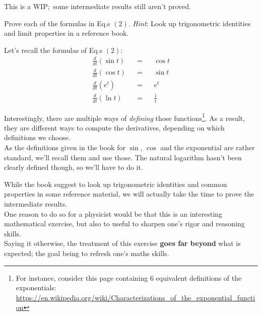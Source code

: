 \documentclass[solutions.tex]{subfiles}
\begin{document}
\maketitle
\begin{remark} This is a WIP; some intermediate results still
aren't proved.
\end{remark}
\begin{exercise} Prove each of the formulas in Eq.s $(2)$.
\textit{Hint}: Look up trigonometric identities and limit
properties in a reference book.
\end{exercise}

Let's recall the formulas of Eq.s $(2)$:
\begin{equation*} \begin{aligned}
	\frac{d}{dt}(\sin t) &&=&& \cos t \\
	\frac{d}{dt}(\cos t) &&=&& \sin t \\
	\frac{d}{dt}(e^t) &&=&& e^t \\
	\frac{d}{dt}(\ln t) &&=&& \frac{1}{t}
\end{aligned} \end{equation*}

\begin{remark}
Interestingly, there are multiple ways of \textit{defining}
those functions\footnote{For instance, consider this page
containing $6$ equivalent definitions of the exponentials:
\url{https://en.wikipedia.org/wiki/Characterizations\_of\_the\_exponential\_function}}.
As a result, they are different ways to compute the derivatives,
depending on which definitions we choose. \\

As the definitions given in the book for $\sin$, $\cos$ and
the exponential are rather standard, we'll recall them and use
those. The natural logarithm hasn't been clearly defined though,
so we'll have to do it.
\end{remark}
\begin{remark} While the book suggest to look up trigonometric
identities and common properties in some reference material, we
will actually take the time to prove the intermediate results. \\

One reason to do so for a physicist would be that this is an
interesting mathematical exercise, but also to useful to sharpen
one's rigor and reasoning skills. \\

Saying it otherwise, the treatment of this exercise \textbf{goes
far beyond} what is expected; the goal being to refresh one's maths
skills.
\end{remark}
\end{document}
